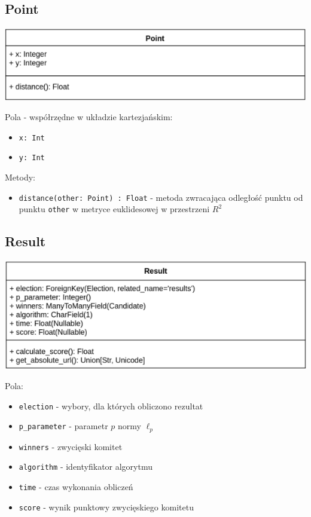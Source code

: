 \documentclass[pdflatex,11pt]{../aghdoc_version2}
\newcommand{\code}[1]{\texttt{#1}}
\begin{document}
\subsection{Point}
\begin{center}
\centerline{\includegraphics[scale=0.85]{pics/Point.png}}
\end{center}
\clearpage
Pola - współrzędne w układzie kartezjańskim:
\begin{itemize}
\item \code{x: Int}
\item \code{y: Int}
\end{itemize}
Metody:
\begin{itemize}
\item \code{distance(other: Point) : Float} - metoda zwracająca odległość punktu od punktu \code{other} w metryce euklidesowej w przestrzeni $R^2$
\end{itemize}

\subsection{Result}
\begin{center}
\centerline{\includegraphics[scale=0.85]{pics/Result.png}}
\end{center}
Pola:
\begin{itemize}
\item \code{election} - wybory, dla których obliczono rezultat
\item \code{p\_parameter} - parametr $p$ normy $\ell_p$
\item \code{winners} - zwycięski komitet
\item \code{algorithm} - identyfikator algorytmu
\item \code{time} - czas wykonania obliczeń
\item \code{score} - wynik punktowy zwycięskiego komitetu
\end{itemize}
\end{document}
